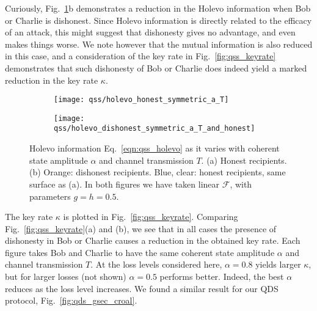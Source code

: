 Curiously, Fig.~\ref{fig:qss_holevo_information}b demonstrates a reduction in the Holevo information when Bob or Charlie is dishonest. Since Holevo information is directly related to the efficacy of an attack, this might suggest that dishonesty gives no advantage, and even makes things worse. We note however that the mutual information is also reduced in this case, and a consideration of the key rate in Fig.~\ref{fig:qss_keyrate} demonstrates that such dishonesty of Bob or Charlie does indeed yield a marked reduction in the key rate $\kappa$. %

\begin{figure}[htp]
\captionsetup{width=0.8\linewidth}
\centering
	\begin{subfigure}{0.49\linewidth}
	\centering
	\texttt{[image: qss/holevo\_honest\_symmetric\_a\_T]}
	\caption{}	
	\end{subfigure}
	\begin{subfigure}{0.49\linewidth}
	\centering
	\texttt{[image: qss/holevo\_dishonest\_symmetric\_a\_T\_and\_honest]}
	\caption{}	
	\end{subfigure}
\caption{\label{fig:qss_holevo_information} Holevo information Eq.~\ref{eqn:qss_holevo} as it varies with coherent state amplitude $\alpha$ and channel transmission $T$. (a) Honest recipients. (b) Orange: dishonest recipients. Blue, clear: honest recipients, same surface as (a). In both figures we have taken linear $\mathcal{F}$, with parameters $g = h = 0.5$.}
\end{figure}

The key rate $\kappa$ is plotted in Fig.~\ref{fig:qss_keyrate}. Comparing Fig.~\ref{fig:qss_keyrate}(a) and (b), we see that in all cases the presence of dishonesty in Bob or Charlie causes a reduction in the obtained key rate. Each figure takes Bob and Charlie to have the same coherent state amplitude $\alpha$ and channel transmission $T$. At the loss levels considered here, $\alpha=0.8$ yields larger $\kappa$, but for larger losses (not shown) $\alpha=0.5$ performs better. Indeed, the best $\alpha$ reduces as the loss level increases. We found a similar result for our QDS protocol, Fig.~\ref{fig:qds_gsec_croal}.

